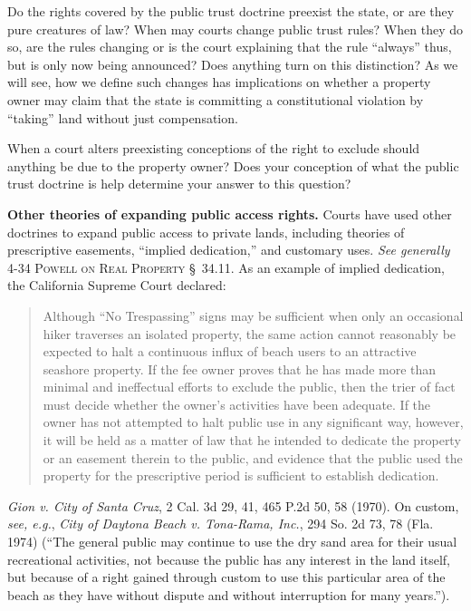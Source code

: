 
\item Do the rights covered by the public trust doctrine preexist the state, or
are they pure creatures of law? When may courts change public trust rules? When
they do so, are the rules changing or is the court explaining that the rule
``always'' thus, but is only now being announced? Does anything turn on this
distinction? As we will see, how we define such changes has implications on
whether a property owner may claim that the state is committing a constitutional
violation by ``taking'' land without just compensation. 


\item When a court alters preexisting conceptions of the right to exclude should
anything be due to the property owner? Does your conception of what the public
trust doctrine is help determine your answer to this question?


\item \textbf{Other theories of expanding public access rights.} Courts have
used other doctrines to expand public access to private lands, including
theories of prescriptive easements, ``implied dedication,'' and customary uses.
\textit{See generally} 4-34 \textsc{Powell on Real Property} \S~34.11. As an
example of implied dedication, the California Supreme Court declared:
\begin{quote}
Although ``No Trespassing'' signs may be sufficient when only an occasional
hiker
traverses an isolated property, the same action cannot reasonably be expected to
halt a continuous influx of beach users to an attractive seashore property. If
the fee owner proves that he has made more than minimal and ineffectual efforts
to exclude the public, then the trier of fact must decide whether the owner's
activities have been adequate. If the owner has not attempted to halt public use
in any significant way, however, it will be held as a matter of law that he
intended to dedicate the property or an easement therein to the public, and
evidence that the public used the property for the prescriptive period is
sufficient to establish dedication.
\end{quote}
\emph{Gion v. City of Santa Cruz}, 2 Cal. 3d 29, 41, 465 P.2d 50, 58 (1970). On
custom, \textit{see, e.g.}, \emph{City of Daytona Beach v. Tona-Rama, Inc.}, 294
So. 2d 73, 78 (Fla. 1974) (``The general public may continue to use the dry sand
area for their usual recreational activities, not because the public has any
interest in the land itself, but because of a right gained through custom to use
this particular area of the beach as they have without dispute and without
interruption for many years.'').




